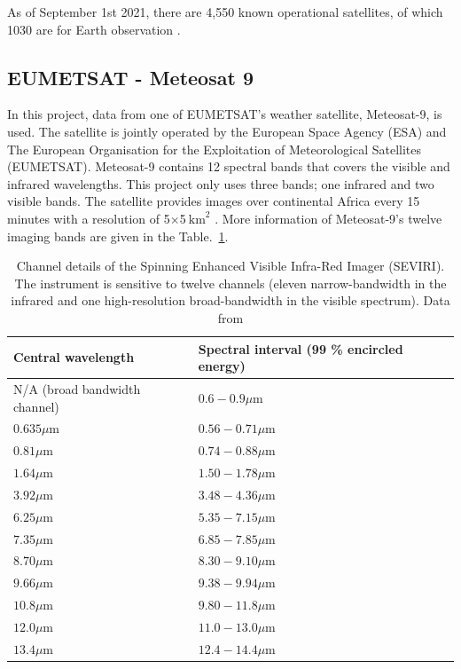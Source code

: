 As of September 1st 2021, there are 4,550 known operational satellites, of which 1030 are for Earth observation \cite{Sat_Data}. 


\subsection{EUMETSAT - Meteosat 9}


In this project, data from one of EUMETSAT's weather satellite, Meteosat-9, is used. The satellite is jointly operated by the European Space Agency (ESA) and The European Organisation for the Exploitation of Meteorological Satellites (EUMETSAT). Meteosat-9 contains 12 spectral bands that covers the visible and infrared wavelengths. This project only uses three bands; one infrared and two visible bands. The satellite provides images over continental Africa every 15 minutes with a resolution of 5$\times$5$\mathrm{~km}^{2}$ \cite{Meteosat9}. More information of Meteosat-9's twelve imaging bands are given in the Table.~\ref{Table1}.

\begin{table}[H]
\centering
\begin{tabular}{|l|l|}
\hline \textbf{Central wavelength} & \textbf{Spectral interval (99 \% encircled energy)} \\
\hline N/A (broad bandwidth channel) &
$0.6-0.9 \mu \mathrm{m}$ \\
\hline $0.635 \mu \mathrm{m}$ & $0.56-0.71 \mu \mathrm{m}$ \\
\hline $0.81 \mu \mathrm{m}$ & $0.74-0.88 \mu \mathrm{m}$ \\
\hline $1.64 \mu \mathrm{m}$ & $1.50-1.78 \mu \mathrm{m}$ \\
\hline $3.92 \mu \mathrm{m}$ & $3.48-4.36 \mu \mathrm{m}$ \\
\hline $6.25 \mu \mathrm{m}$ & $5.35-7.15 \mu \mathrm{m}$ \\
\hline $7.35 \mu \mathrm{m}$ & $6.85-7.85 \mu \mathrm{m}$ \\
\hline $8.70 \mu \mathrm{m}$ & $8.30-9.10 \mu \mathrm{m}$ \\
\hline $9.66 \mu \mathrm{m}$ & $9.38-9.94 \mu \mathrm{m}$ \\
\hline $10.8 \mu \mathrm{m}$ & $9.80-11.8 \mu \mathrm{m}$ \\
\hline $12.0 \mu \mathrm{m}$ & $11.0-13.0 \mu \mathrm{m}$ \\
\hline $13.4 \mu \mathrm{m}$ & $12.4-14.4 \mu \mathrm{m}$ \\
\hline
\end{tabular}
\caption{\label{tab:Table1} Channel details of the Spinning Enhanced Visible Infra-Red Imager (SEVIRI). The instrument is sensitive to twelve channels (eleven narrow-bandwidth in the infrared and one high-resolution broad-bandwidth in the visible spectrum). Data from \cite{Table1}}
\label{Table1}
\end{table}



